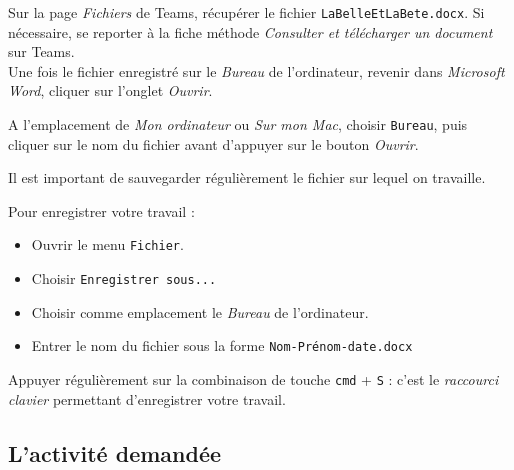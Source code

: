 Sur la page \emph{Fichiers} de Teams, récupérer le fichier \texttt{LaBelleEtLaBete.docx}. Si nécessaire, se reporter à la fiche méthode \emph{Consulter et télécharger un document} sur Teams.\\

Une fois le fichier enregistré sur le \emph{Bureau} de l'ordinateur, revenir dans \emph{Microsoft Word}, cliquer sur l'onglet \emph{Ouvrir}.


A l'emplacement de \emph{Mon ordinateur} ou \emph{Sur mon Mac}, choisir \texttt{Bureau}, puis cliquer sur le nom du fichier avant d'appuyer sur le bouton \emph{Ouvrir}.      






Il est important de sauvegarder régulièrement le fichier sur lequel on travaille.

Pour enregistrer votre travail :
\begin{itemize}
\item Ouvrir le menu \texttt{Fichier}.
\item Choisir \texttt{Enregistrer sous...}
\item Choisir comme emplacement le \emph{Bureau} de l'ordinateur.
\item Entrer le nom du fichier sous la forme \texttt{Nom-Prénom-date.docx}
\end{itemize}


Appuyer régulièrement sur la combinaison de touche \texttt{cmd} + \texttt{S} : c'est le \emph{raccourci clavier} permettant d'enregistrer votre travail.



\subsection{L'activité demandée}


